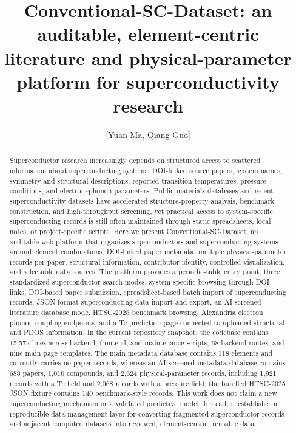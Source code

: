 \documentclass[11pt,a4paper]{article}
\title{Conventional-SC-Dataset: an auditable, element-centric literature and physical-parameter platform for superconductivity research}
\author[1]{[Yuan Ma, Qiang Guo]}
\affil[1]{[Your Affiliation]}
\date{}
\begin{document}
\maketitle

\begin{abstract}
Superconductor research increasingly depends on structured access to scattered information about superconducting systems: DOI-linked source papers, system names, symmetry and structural descriptions, reported transition temperatures, pressure conditions, and electron--phonon parameters. Public materials databases and recent superconductivity datasets have accelerated structure-property analysis, benchmark construction, and high-throughput screening, yet practical access to system-specific superconducting records is still often maintained through static spreadsheets, local notes, or project-specific scripts. Here we present Conventional-SC-Dataset, an auditable web platform that organizes superconductors and superconducting systems around element combinations, DOI-linked paper metadata, multiple physical-parameter records per paper, structural information, contributor identity, controlled visualization, and selectable data sources. The platform provides a periodic-table entry point, three standardized superconductor-search modes, system-specific browsing through DOI links, DOI-based paper submission, spreadsheet-based batch import of superconducting records, JSON-format superconducting-data import and export, an AI-screened literature database mode, HTSC-2025 benchmark browsing, Alexandria electron--phonon coupling endpoints, and a Tc-prediction page connected to uploaded structural and PDOS information. In the current repository snapshot, the codebase contains 15,572 lines across backend, frontend, and maintenance scripts, 68 backend routes, and nine main page templates. The main metadata database contains 118 elements and currently carries no paper records, whereas an AI-screened metadata database contains 688 papers, 1,010 compounds, and 2,624 physical-parameter records, including 1,921 records with a Tc field and 2,068 records with a pressure field; the bundled HTSC-2025 JSON fixture contains 140 benchmark-style records. This work does not claim a new superconducting mechanism or a validated predictive model. Instead, it establishes a reproducible data-management layer for converting fragmented superconductor records and adjacent computed datasets into reviewed, element-centric, reusable data.
\end{abstract}
\end{document}
